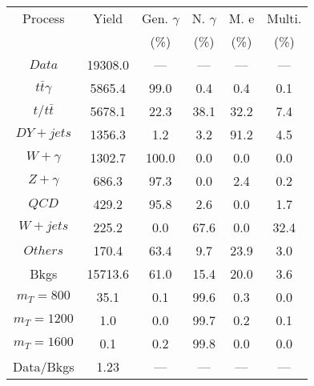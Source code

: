 \begin{figure}
\begin{minipage}[c]{0.32\textwidth}
{\begin{tabular}{cccccc}
\hline
Process & Yield & Gen. $\gamma$ & N. $\gamma$ & M. e & Multi. \\
 &  & (\%) & (\%) & (\%) & (\%)  \\
\hline
                                                                      $ Data $ &  19308.0 &  --- &  --- &  --- &  ---\\
$ t\bar{t}\gamma $ &  5865.4 &  99.0 &  0.4 &  0.4 &  0.1\\
$ t/t\bar{t} $ &  5678.1 &  22.3 &  38.1 &  32.2 &  7.4\\
$ DY+jets $ &  1356.3 &  1.2 &  3.2 &  91.2 &  4.5\\
$ W+\gamma $ &  1302.7 &  100.0 &  0.0 &  0.0 &  0.0\\
$ Z+\gamma $ &  686.3 &  97.3 &  0.0 &  2.4 &  0.2\\
$ QCD $ &  429.2 &  95.8 &  2.6 &  0.0 &  1.7\\
$ W+jets $ &  225.2 &  0.0 &  67.6 &  0.0 &  32.4\\
$ Others $ &  170.4 &  63.4 &  9.7 &  23.9 &  3.0\\
Bkgs &  15713.6 &  61.0 &  15.4 &  20.0 &  3.6\\
$ m_{T} = 800 $ &  35.1 &  0.1 &  99.6 &  0.3 &  0.0\\
$ m_{T} = 1200 $ &  1.0 &  0.0 &  99.7 &  0.2 &  0.1\\
$ m_{T} = 1600 $ &  0.1 &  0.2 &  99.8 &  0.0 &  0.0\\
Data/Bkgs &  1.23 &  --- &  --- &  --- &  ---\\
\hline
\end{tabular}
}
\end{minipage}
\end{figure}

